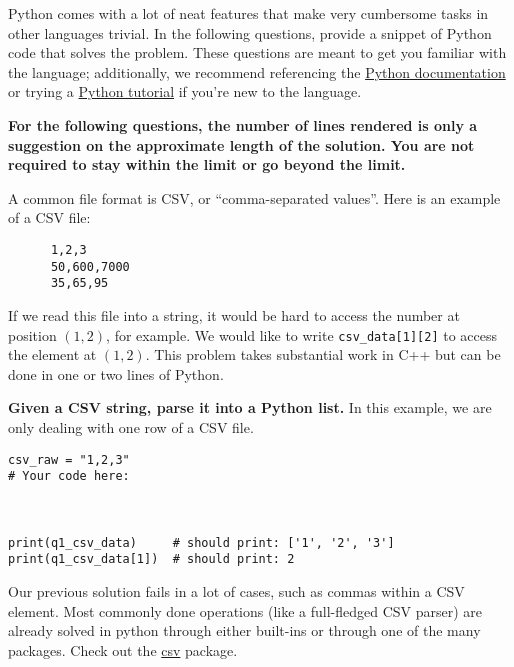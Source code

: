 \documentclass{article}
\begin{document}
Python comes with a lot of neat features that make very cumbersome tasks in other languages trivial. In the following questions, provide a snippet of Python code that solves the problem. These questions are meant to get you familiar with the language; additionally, we recommend referencing the \href{https://docs.python.org/3/}{Python documentation} or trying a \href{http://www.learnpython.org/}{Python tutorial} if you're new to the language. 

\textbf{For the following questions, the number of lines rendered is only a suggestion on the approximate length of the solution. You are not required to stay within the limit or go beyond the limit.}
\begin{enumerate}

\begin{minipage}{\textwidth}
    \item A common file format is CSV, or ``comma-separated values''. Here is an example of a CSV file:
  
    \begin{verbatim}
      1,2,3
      50,600,7000
      35,65,95\end{verbatim}
  
    If we read this file into a string, it would be hard to access the number at position $(1, 2)$, for example. We would like to write \texttt{csv\_data[1][2]} to access the element at $(1, 2)$. This problem takes substantial work in C++ but can be done in one or two lines of Python.
  
    \textbf{Given a CSV string, parse it into a Python list.} In this example, we are only dealing with one row of a CSV file.
    \begin{lstlisting}[style=Python]
csv_raw = "1,2,3"
# Your code here:



print(q1_csv_data)     # should print: ['1', '2', '3']
print(q1_csv_data[1])  # should print: 2
    \end{lstlisting}
\end{minipage}

\begin{minipage}{\textwidth}
    \item Our previous solution fails in a lot of cases, such as commas within a CSV element. Most commonly done operations (like a full-fledged CSV parser) are already solved in python through either built-ins or through one of the many packages. Check out the \href{https://docs.python.org/2/library/csv.html}{csv} package.


\end{minipage}
\end{enumerate}
\end{document}
